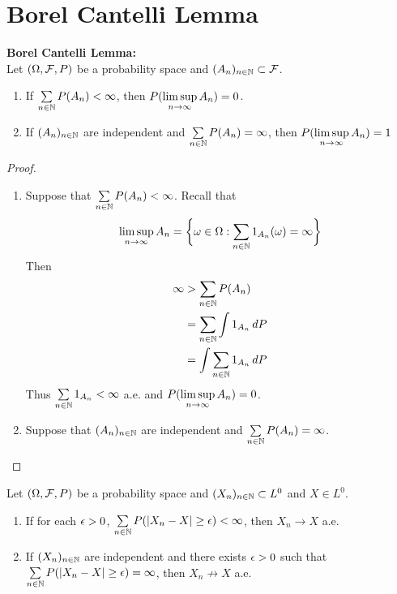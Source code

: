 \documentclass{book}
\begin{document}
	
	
	
	
	
	
	
	
	
	
	
	
	
	\newpage
	\section{Borel Cantelli Lemma} 
	
	\begin{ex}\textbf{Borel Cantelli Lemma:}\\
		Let $(\Omega, \mathcal{F}, P)$ be a probability space and $(A_n)_{n \in \mathbb{N}} \subset \mathcal{F}$.
		\begin{enumerate}
			\item If $\sum\limits_{n \in \mathbb{N}}P(A_n) < \infty$, then $P(\limsup \limits_{n \rightarrow \infty} A_n) = 0$.
			\item If $(A_n)_{n \in \mathbb{N}}$ are independent and $\sum\limits_{n \in \mathbb{N}} P(A_n) = \infty$, then $P( \limsup \limits_{n \rightarrow \infty} A_n) = 1$  
		\end{enumerate}
	\end{ex}
	
	\begin{proof}\
		\begin{enumerate}
			\item Suppose that $\sum\limits_{n \in \mathbb{N}}P(A_n) < \infty$. Recall that $$\limsup\limits_{n \rightarrow \infty}A_n = \bigg \{\omega \in \Omega: \sum\limits_{n \in \mathbb{N}}1_{A_n}(\omega) = \infty \bigg \}$$ Then \begin{align*}
				\infty 
				&> \sum_{n \in \mathbb{N}}P(A_n) \\
				&= \sum_{n \in \mathbb{N}} \int 1_{A_n}\, d P \\
				&= \int \sum_{n \in \mathbb{N}} 1_{A_n}\, d P \\
			\end{align*}
			Thus $\sum \limits_{n \in \mathbb{N}} 1_{A_n} < \infty$ a.e. and $P(\limsup \limits_{n \rightarrow \infty} A_n) = 0$.
			\item Suppose that $(A_n)_{n \in \mathbb{N}}$ are independent and $\sum\limits_{n \in \mathbb{N}} P(A_n) = \infty$.
		\end{enumerate}
	\end{proof}
	
	\begin{ex}
		Let $(\Omega, \mathcal{F}, P)$ be a probability space and $(X_n)_{n \in \mathbb{N}} \subset L^0$ and $X \in L^0$. 
		\begin{enumerate}
			\item If for each $\epsilon >0 $, $\sum\limits_{n \in \mathbb{N}} P(|X_n -X| \geq \epsilon) < \infty$, then $X_n \rightarrow X$ a.e.
			\item If $(X_n)_{n \in \mathbb{N}}$ are independent and there exists $\epsilon >0$ such that $\sum\limits_{n \in \mathbb{N}} P(|X_n -X| \geq \epsilon) = \infty$, then $X_n \not \rightarrow X$ a.e.
		\end{enumerate}
	\end{ex}
	
\end{document}
